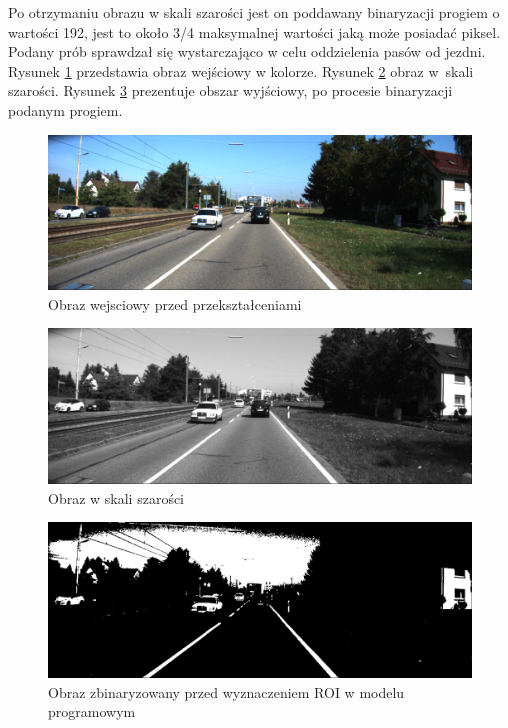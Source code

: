 Po otrzymaniu obrazu w skali szarości jest on poddawany binaryzacji progiem o wartości 192, jest to około 3/4 maksymalnej wartości jaką może posiadać piksel.
Podany prób sprawdzał się wystarczająco w celu oddzielenia pasów od jezdni. 
Rysunek \ref{fig:im_color} przedstawia obraz wejściowy w kolorze. Rysunek \ref{fig:im_grey} obraz w~skali szarości. Rysunek \ref{fig:in_ROI} prezentuje obszar wyjściowy, po procesie binaryzacji podanym progiem.

\begin{figure}[h]
	\centering
	\includegraphics[scale=0.3]{obraz_color.png}
	\caption{Obraz wejsciowy przed przekształceniami}
	\label{fig:im_color}
\end{figure}
\begin{figure}[h]
	\centering
	\includegraphics[scale=0.3]{obraz_grey.png}
	\caption{Obraz w skali szarości}
	\label{fig:im_grey}
\end{figure}
\begin{figure}[h]
	\centering
	\includegraphics[scale=0.3]{obraz_binarny.png}
	\caption{Obraz zbinaryzowany przed wyznaczeniem ROI w modelu programowym}
	\label{fig:in_ROI}
\end{figure}
